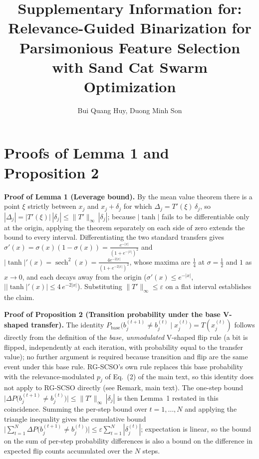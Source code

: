 \documentclass[9pt]{article}
\title{Supplementary Information for: Relevance-Guided Binarization for
Parsimonious Feature Selection with Sand Cat Swarm Optimization}
\author{Bui Quang Huy, Duong Minh Son}
\date{}
\begin{document}
\maketitle

\FloatBarrier
\section{Proofs of Lemma 1 and Proposition 2}
\textbf{Proof of Lemma 1 (Leverage bound).} By the mean value theorem
there is a point $\xi$ strictly between $x_j$ and $x_j+\delta_j$ for which
$\Delta_j=T'(\xi)\,\delta_j$, so
$|\Delta_j|=|T'(\xi)|\,|\delta_j|\le\|T'\|_\infty\,|\delta_j|$; because
$|\tanh|$ fails to be differentiable only at the origin, applying the
theorem separately on each side of zero extends the bound to every
interval. Differentiating the two standard transfers gives
$\sigma'(x)=\sigma(x)(1-\sigma(x))=\tfrac{e^{-|x|}}{(1+e^{-|x|})^2}$ and
$|\tanh|'(x)=\operatorname{sech}^2(x)=\tfrac{4e^{-2|x|}}{(1+e^{-2|x|})^2}$,
whose maxima are $\tfrac14$ at $\sigma=\tfrac12$ and $1$ as $x\to0$, and
each decays away from the origin ($\sigma'(x)\le e^{-|x|}$,
$\big||\tanh|'(x)\big|\le 4\,e^{-2|x|}$). Substituting
$\|T'\|_\infty\le\varepsilon$ on a flat interval establishes the claim.

\textbf{Proof of Proposition 2 (Transition probability under the base
V-shaped transfer).} The identity $P_{\text{base}}\big(b_j^{(t+1)}\ne
b_j^{(t)}\mid
x_j^{(t)}\big)=T(x_j^{(t)})$ follows directly from the definition of the
\emph{base, unmodulated} V-shaped flip rule (a bit is flipped, independently
at each iteration, with probability equal to the transfer value); no further
argument is required because transition and flip are the same event under
this base rule. RG-SCSO's own rule replaces this base probability with the
relevance-modulated $p_j$ of Eq.~(2) of the main text, so this identity does
not apply to RG-SCSO directly (see Remark, main text). The
one-step bound $\big|\Delta P\big(b_j^{(t+1)}\ne b_j^{(t)}\big)\big|\le
\|T'\|_\infty\,|\delta_j|$ is then Lemma~1 restated in this coincidence.
Summing the per-step bound over $t=1,\dots,N$ and applying the triangle
inequality gives the cumulative bound
$\big|\sum_{t=1}^{N}\Delta P\big(b_j^{(t+1)}\ne b_j^{(t)}\big)\big|\le
\varepsilon\sum_{t=1}^{N}|\delta_j^{(t)}|$; expectation is linear, so the
bound on the sum of per-step probability differences is also a bound on
the difference in expected flip counts accumulated over the $N$ steps.
\end{document}
